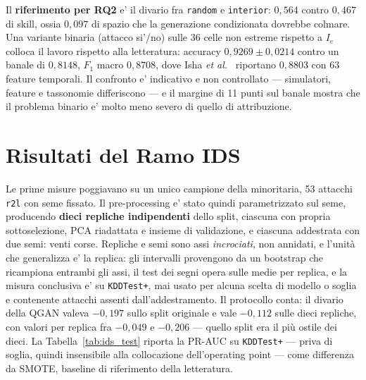 \documentclass[10pt,conference,a4paper,twocolumn]{IEEEtran}
\begin{document}
Il \textbf{riferimento per RQ2} e' il divario fra \texttt{random} e \texttt{interior}: $0{,}564$ contro $0{,}467$ di skill, ossia \textbf{$0{,}097$} di spazio che la generazione condizionata dovrebbe colmare. Una variante binaria (attacco si'/no) sulle 36 celle non estreme rispetto a $I_e$ colloca il lavoro rispetto alla letteratura: accuracy $0{,}9269 \pm 0{,}0214$ contro un banale di $0{,}8148$, $F_1$ macro $0{,}8708$, dove Isha \textit{et al.}~\cite{attacco_binario} riportano $0{,}8803$ con 63 feature temporali. Il confronto e' indicativo e non controllato — simulatori, feature e tassonomie differiscono — e il margine di 11 punti sul banale mostra che il problema binario e' molto meno severo di quello di attribuzione.

\section{Risultati del Ramo IDS}

Le prime misure poggiavano su un unico campione della minoritaria, 53 attacchi \texttt{r2l} con seme fissato. Il pre-processing e' stato quindi parametrizzato sul seme, producendo \textbf{dieci repliche indipendenti} dello split, ciascuna con propria sottoselezione, PCA riadattata e insieme di validazione, e ciascuna addestrata con due semi: venti corse. Repliche e semi sono assi \emph{incrociati}, non annidati, e l'unità che generalizza e' la replica: gli intervalli provengono da un bootstrap che ricampiona entrambi gli assi, il test dei segni opera sulle medie per replica, e la misura conclusiva e' su \texttt{KDDTest+}, mai usato per alcuna scelta di modello o soglia e contenente attacchi assenti dall'addestramento. Il protocollo conta: il divario della QGAN valeva $-0{,}197$ sullo split originale e vale $-0{,}112$ sulle dieci repliche, con valori per replica fra $-0{,}049$ e $-0{,}206$ — quello split era il più ostile dei dieci. La Tabella~\ref{tab:ids_test} riporta la PR-AUC su \texttt{KDDTest+} — priva di soglia, quindi insensibile alla collocazione dell'operating point — come differenza da SMOTE, baseline di riferimento della letteratura.
\end{document}
